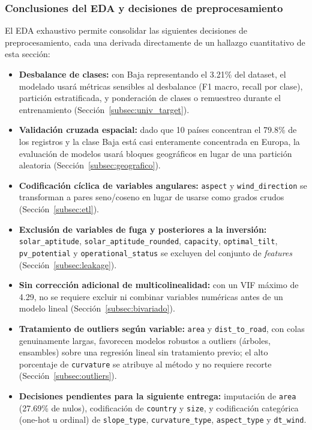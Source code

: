 \documentclass[pdflatex,sn-mathphys-num]{sn-jnl}
\begin{document}
\subsubsection{Conclusiones del EDA y decisiones de preprocesamiento}\label{subsec:conclusiones_eda}

El EDA exhaustivo permite consolidar las siguientes decisiones de preprocesamiento, cada una derivada directamente de un hallazgo cuantitativo de esta sección:

\begin{itemize}
\item \textbf{Desbalance de clases:} con Baja representando el 3.21\% del dataset, el modelado usará métricas sensibles al desbalance (F1 macro, recall por clase), partición estratificada, y ponderación de clases o remuestreo durante el entrenamiento (Sección~\ref{subsec:univ_target}).
\item \textbf{Validación cruzada espacial:} dado que 10 países concentran el 79.8\% de los registros y la clase Baja está casi enteramente concentrada en Europa, la evaluación de modelos usará bloques geográficos en lugar de una partición aleatoria (Sección~\ref{subsec:geografico}).
\item \textbf{Codificación cíclica de variables angulares:} \texttt{aspect} y \texttt{wind\_direction} se transforman a pares seno/coseno en lugar de usarse como grados crudos (Sección~\ref{subsec:etl}).
\item \textbf{Exclusión de variables de fuga y posteriores a la inversión:} \texttt{solar\_aptitude}, \texttt{solar\_aptitude\_rounded}, \texttt{capacity}, \texttt{optimal\_tilt}, \texttt{pv\_potential} y \texttt{operational\_status} se excluyen del conjunto de \emph{features} (Sección~\ref{subsec:leakage}).
\item \textbf{Sin corrección adicional de multicolinealidad:} con un VIF máximo de 4.29, no se requiere excluir ni combinar variables numéricas antes de un modelo lineal (Sección~\ref{subsec:bivariado}).
\item \textbf{Tratamiento de outliers según variable:} \texttt{area} y \texttt{dist\_to\_road}, con colas genuinamente largas, favorecen modelos robustos a outliers (árboles, ensambles) sobre una regresión lineal sin tratamiento previo; el alto porcentaje de \texttt{curvature} se atribuye al método y no requiere recorte (Sección~\ref{subsec:outliers}).
\item \textbf{Decisiones pendientes para la siguiente entrega:} imputación de \texttt{area} (27.69\% de nulos), codificación de \texttt{country} y \texttt{size}, y codificación categórica (one-hot u ordinal) de \texttt{slope\_type}, \texttt{curvature\_type}, \texttt{aspect\_type} y \texttt{dt\_wind}.
\end{itemize}
\end{document}
